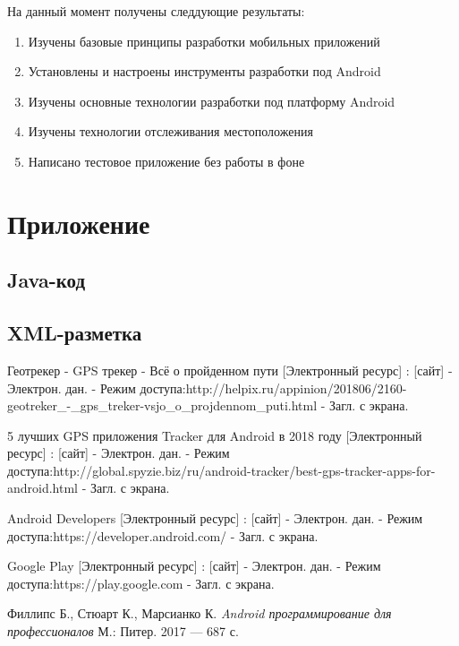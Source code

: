 \documentclass[a4paper,12pt]{article}
\begin{document}
На данный момент получены следдующие результаты:

\begin{enumerate}
\item Изучены базовые принципы разработки мобильных приложений
\item Установлены и настроены инструменты разработки под Android
\item Изучены основные технологии разработки под платформу Android
\item Изучены технологии отслеживания местоположения
\item Написано тестовое приложение без работы в фоне
\end{enumerate}




\pagebreak
\section{Приложение}
\subsection{Java-код}

\subsection{XML-разметка}

\pagebreak

\renewcommand{\bibname}{Библиографический список использованной литературы}
\begin{thebibliography}{99}
\vspace{5mm}

Геотрекер - GPS трекер - Всё о пройденном пути [Электронный ресурс] : [сайт] - Электрон. дан. 
- Режим доступа:http://helpix.ru/appinion/201806/2160-geotreker\_-\_gps\_treker-vsjo\_o\_projdennom\_puti.html - Загл. с экрана.

5 лучших GPS приложения Tracker для Android в 2018 году [Электронный ресурс] : [сайт] - Электрон. дан. 
- Режим доступа:http://global.spyzie.biz/ru/android-tracker/best-gps-tracker-apps-for-android.html - Загл. с экрана.

Android Developers [Электронный ресурс] : [сайт] - Электрон. дан. 
- Режим доступа:https://developer.android.com/ - Загл. с экрана.

Google Play [Электронный ресурс] : [сайт] - Электрон. дан. 
- Режим доступа:https://play.google.com - Загл. с экрана.

Филлипс Б., Стюарт К., Марсианко К. {\it Android программирование для профессионалов} М.: Питер. 2017 --- 687 с.

\end{thebibliography}

\end{document}
